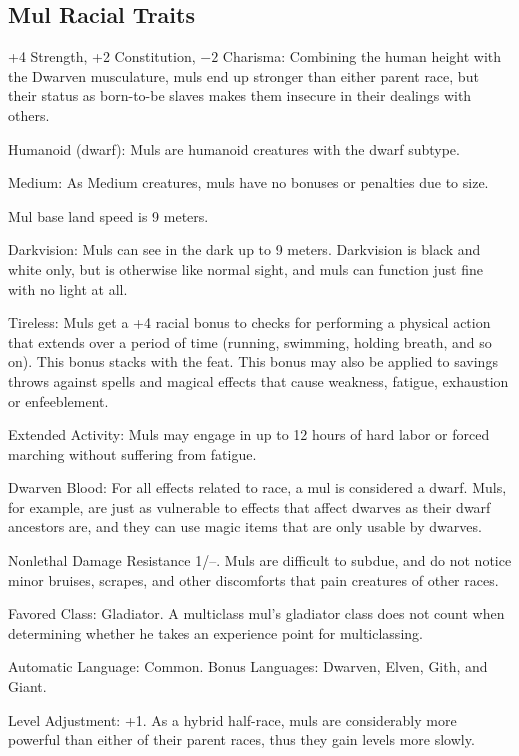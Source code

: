 \subsection{Mul Racial Traits}
\begin{itemize*}
    \item +4 Strength, +2 Constitution, $-2$ Charisma: Combining the human height with the Dwarven musculature, muls end up stronger than either parent race, but their status as born-to-be slaves makes them insecure in their dealings with others.
    \item Humanoid (dwarf): Muls are humanoid creatures with the dwarf subtype.
    \item Medium: As Medium creatures, muls have no bonuses or penalties due to size.
    \item Mul base land speed is 9 meters.
    \item Darkvision: Muls can see in the dark up to 9 meters. Darkvision is black and white only, but is otherwise like normal sight, and muls can function just fine with no light at all.
    \item Tireless: Muls get a +4 racial bonus to checks for performing a physical action that extends over a period of time (running, swimming, holding breath, and so on). This bonus stacks with the  feat. This bonus may also be applied to savings throws against spells and magical effects that cause weakness, fatigue, exhaustion or enfeeblement.
    \item Extended Activity: Muls may engage in up to 12 hours of hard labor or forced marching without suffering from fatigue.
    \item Dwarven Blood: For all effects related to race, a mul is considered a dwarf. Muls, for example, are just as vulnerable to effects that affect dwarves as their dwarf ancestors are, and they can use magic items that are only usable by dwarves.
    \item Nonlethal Damage Resistance 1/--. Muls are difficult to subdue, and do not notice minor bruises, scrapes, and other discomforts that pain creatures of other races.
    \item Favored Class: Gladiator. A multiclass mul's gladiator class does not count when determining whether he takes an experience point for multiclassing.
    \item Automatic Language: Common. Bonus Languages: Dwarven, Elven, Gith, and Giant.
    \item Level Adjustment: +1. As a hybrid half-race, muls are considerably more powerful than either of their parent races, thus they gain levels more slowly.
\end{itemize*}